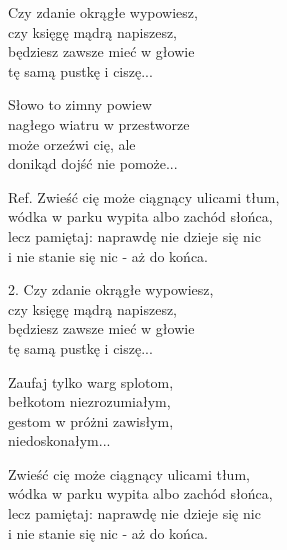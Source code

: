 \begin{text}
    Czy zdanie okrągłe wypowiesz,\\
    czy księgę mądrą napiszesz,\\
    będziesz zawsze mieć w głowie\\
    tę samą pustkę i ciszę...

    Słowo to zimny powiew\\
    nagłego wiatru w przestworze\\
    może orzeźwi cię, ale\\
    donikąd dojść nie pomoże...

    Ref. Zwieść cię może ciągnący ulicami tłum,\\
    wódka w parku wypita albo zachód słońca,\\
    lecz pamiętaj: naprawdę nie dzieje się nic\\
    i nie stanie się nic - aż do końca.

    2. Czy zdanie okrągłe wypowiesz,\\
    czy księgę mądrą napiszesz,\\
    będziesz zawsze mieć w głowie\\
    tę samą pustkę i ciszę...

    Zaufaj tylko warg splotom,\\
    bełkotom niezrozumiałym,\\
    gestom w próżni zawisłym,\\
    niedoskonałym...

    Zwieść cię może ciągnący ulicami tłum,\\
    wódka w parku wypita albo zachód słońca,\\
    lecz pamiętaj: naprawdę nie dzieje się nic\\
    i nie stanie się nic - aż do końca.
\end{text}
\begin{chord}

\end{chord}